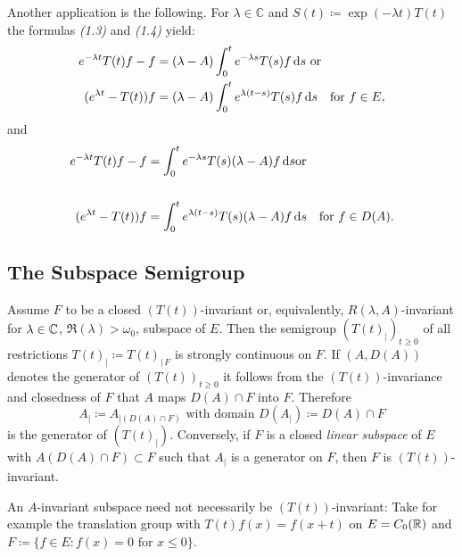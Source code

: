 Another application is the following.
For $\lambda \in \mathbb{C}$ and $S(t) \coloneqq \exp(-\lambda t)T(t)$ the formulas \emph{(1.3)} and \emph{(1.4)} yield:
\begin{align*}
    e^{-\lambda t}T(t)f - f &= (\lambda-A) \int_{0}^{t} e^{-\lambda s}T(s)f \ds \text{ or }\notag \\
    (e^{\lambda t}-T(t))f &= (\lambda-A) \int_{0}^{t} e^{\lambda(t-s)}T(s)f \ds \quad \text{for } f \in E, %
\end{align*}
and
\begin{align*}
    e^{-\lambda t}T(t)f - f &= \int_{0}^{t} e^{-\lambda s}T(s)(\lambda-A)f \ds  \text{or}\notag \\
    \notag \\
    (e^{\lambda t} - T(t))f &= \int_{0}^{t} e^{\lambda(t-s)}T(s)(\lambda-A)f \ds \quad \text{for } f \in D(A). %
\end{align*}
\subsection{The Subspace Semigroup}\label{subsec:a1-3.2}
Assume $F$ to be a closed $(T(t))$-invariant or, equivalently, $R(\lambda,A)$-invariant for 
$\lambda \in \mathbb{C}$, 
$ \Re(\lambda) > \omega_{0}$, subspace of $E$.
Then the semigroup $(T(t)_{|})_{t \geq 0}$ of all restrictions $T(t)_{|} \coloneqq T(t)_{|\,F}$ is strongly continuous on $F$.
If $(A,D(A))$ denotes the generator of $(T(t))_{t \geq 0}$ it follows from the $(T(t))$-invariance and closedness of $F$ that $A$ maps $D(A) \cap F$ into $F$.
Therefore
\[
    A_{|} \coloneqq A_{| (D(A)\cap F)} \text{ with domain } D(A_{|}) \coloneqq D(A) \cap F
\]
is the generator of $(T(t)_{|})$.
%
Conversely, if $F$ is a closed \emph{linear subspace} of $E$ with $A(D(A) \cap F) \subset F$ such that 
$A_{|}$ is a generator on $F$, then $F$ is $(T(t))$-invariant.

An $A$-invariant subspace need not necessarily be $(T(t))$-invariant:
Take for example the translation group with $T(t)f(x) = f(x+t)$ on $E = C_{0}(\mathbb{R})$ and $F \coloneqq \{f \in E \colon f(x) = 0 \text{ for } x \leq 0\}$.
